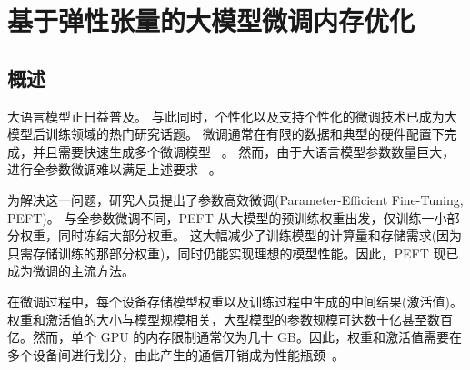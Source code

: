 
\chapter{基于弹性张量的大模型微调内存优化}

\section{概述}

大语言模型\cite{GPT-3,llama2,bloom176b,gpt4}正日益普及。
与此同时，个性化以及支持个性化的微调技术\cite{sun2019fine,wortsman2022robust,dodge2020fine}已成为大模型后训练领域的热门研究话题。
微调通常在有限的数据和典型的硬件配置下完成\cite{zhou2023mpress,feng2023mobius,atc-finetune}，并且需要快速生成多个微调模型 ~\cite{ftsurvey-1,ftsurvey-2,ftsurvey-3}。
然而，由于大语言模型参数数量巨大，进行全参数微调难以满足上述要求 ~\cite{zhou2022pets,slora,opendelta}。

为解决这一问题，研究人员提出了参数高效微调(Parameter-Efficient Fine-Tuning, PEFT)。
与全参数微调不同，PEFT 从大模型的预训练权重出发，仅训练一小部分权重，同时冻结大部分权重\cite{peft-adapter-lora,peft-prompt-tuning,peft-adapterfusion,peft-bitfit,peft-P-tuning}。
这大幅减少了训练模型的计算量和存储需求(因为只需存储训练的那部分权重)，同时仍能实现理想的模型性能。因此，PEFT 现已成为微调的主流方法\cite{peft-overview,delta-tuning-overview,opendelta}。

在微调过程中，每个设备存储模型权重以及训练过程中生成的中间结果(激活值)。权重和激活值的大小与模型规模相关，大型模型的参数规模可达数十亿甚至数百亿。然而，单个 GPU 的内存限制通常仅为几十 GB。因此，权重和激活值需要在多个设备间进行划分，由此产生的通信开销成为性能瓶颈~\cite{zhou2023mpress,feng2023mobius}。

